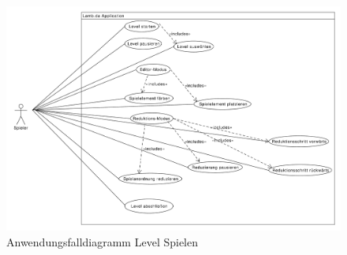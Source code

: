 \begin{figure}[H]
\centering
\includegraphics[scale=0.40]{../use_cases/play_level.pdf}
\caption{Anwendungsfalldiagramm Level Spielen}
\end{figure}
